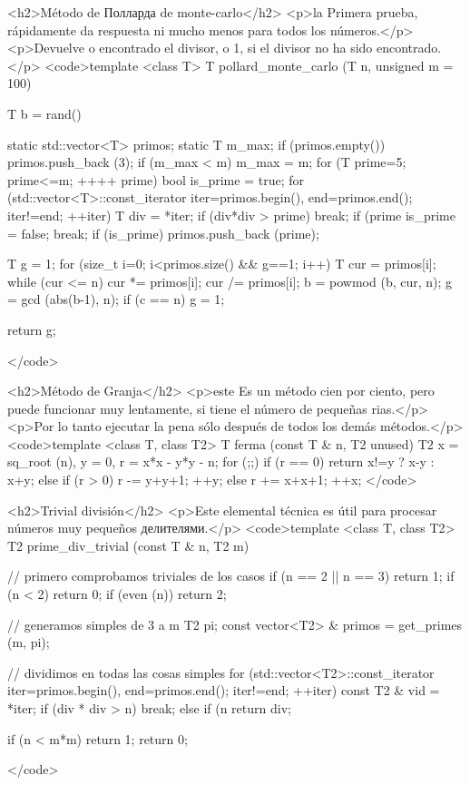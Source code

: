 <h2>Método de Полларда de monte-carlo</h2>
<p>la Primera prueba, rápidamente da respuesta ni mucho menos para todos los números.</p>
<p>Devuelve o encontrado el divisor, o 1, si el divisor no ha sido encontrado.</p>
<code>template <class T>
T pollard_monte_carlo (T n, unsigned m = 100)
{
T b = rand() %

static std::vector<T> primos;
static T m_max;
if (primos.empty())
primos.push_back (3);
if (m_max < m)
{
m_max = m;
for (T prime=5; prime<=m; ++++ prime)
{
bool is_prime = true;
for (std::vector<T>::const_iterator iter=primos.begin(), end=primos.end();
iter!=end; ++iter)
{
T div = *iter;
if (div*div > prime)
break;
if (prime %
{
is_prime = false;
break;
}
}
if (is_prime)
primos.push_back (prime);
}
}

T g = 1;
for (size_t i=0; i<primos.size() && g==1; i++)
{
T cur = primos[i];
while (cur <= n)
cur *= primos[i];
cur /= primos[i];
b = powmod (b, cur, n);
g = gcd (abs(b-1), n);
if (c == n)
g = 1;
}

return g;
}</code>

<h2>Método de Granja</h2>
<p>este Es un método cien por ciento, pero puede funcionar muy lentamente, si tiene el número de pequeñas rias.</p>
<p>Por lo tanto ejecutar la pena sólo después de todos los demás métodos.</p>
<code>template <class T, class T2>
T ferma (const T & n, T2 unused)
{
T2
x = sq_root (n),
y = 0,
r = x*x - y*y - n;
for (;;)
if (r == 0)
return x!=y ? x-y : x+y;
else
if (r > 0)
{
r -= y+y+1;
++y;
}
else
{
r += x+x+1;
++x;
}
}</code>

<h2>Trivial división</h2>
<p>Este elemental técnica es útil para procesar números muy pequeños делителями.</p>
<code>template <class T, class T2>
T2 prime_div_trivial (const T & n, T2 m)
{

// primero comprobamos triviales de los casos
if (n == 2 || n == 3)
return 1;
if (n < 2)
return 0;
if (even (n))
return 2;

// generamos simples de 3 a m
T2 pi;
const vector<T2> & primos = get_primes (m, pi);

// dividimos en todas las cosas simples
for (std::vector<T2>::const_iterator iter=primos.begin(), end=primos.end();
iter!=end; ++iter)
{
const T2 & vid = *iter;
if (div * div > n)
break;
else
if (n %
return div;
}

if (n < m*m)
return 1;
return 0;

}</code>

